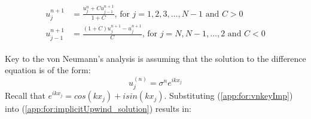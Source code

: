 	\begin{align}
		\label{app:for:implicitSubstitution}
		\begin{split}
			u_j^{n+1} &= \frac{u_j^n + Cu_{j-1}^{n+1}}{1+C}\text{, for $j = 1,2,3,\ldots,N-1$ and $C>0$} \\
			u_{j-1}^{n+1}&= \frac{(1+C)u_j^{n+1} - u_j^{n+1}}{C}\text{, for $j = N, N-1, \ldots, 2$ and $C < 0$}
		\end{split}
	\end{align}
	
	Key to the von Neumann's analysis is assuming that the solution to the difference equation is of the form:
	\begin{equation}
		\label{app:for:vnkeyImp}
		u_j^{(n)} = \sigma^ne^{ikx_j}
	\end{equation}	
	Recall that $e^{ikx_j} = cos(kx_j) + isin(kx_j)$. Substituting (\ref{app:for:vnkeyImp}) into (\ref{app:for:implicitUpwind_solution}) results in:
	
